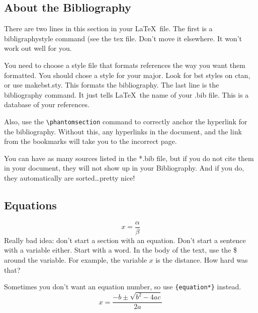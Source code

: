 \documentclass[12pt]{report}
\begin{document}
\subsection{About the Bibliography}
There are two lines in this section in your \LaTeX\ file. The first is a bibligraphystyle command (see the \textsf{tex} file. Don't move it elsewhere. It won't work out well for you.

You need to choose a style file that formats references the way you want them formatted.  You should chose a style for your major.  Look for bst styles on ctan, or use makebst.sty. This formats the bibliography.
The last line is the bibliography command. It just tells \LaTeX\  the name of your \textsf{.bib} file. This is a database of your references.

Also, use the \verb'\phantomsection' command to correctly anchor the hyperlink for the bibliography.  Without this, any hyperlinks in the document, and the link from the bookmarks will take you to the incorrect page.

You can have as many sources listed in the *.bib file, but if you do not cite them in your document, they will not show up in your Bibliography.  And if you do, they automatically are sorted\ldots pretty nice!

\subsection{Equations}\label{sec:equations}
\begin{equation}\label{eq:alphaoverbeta} %
x=\frac{\alpha}{\beta}
\end{equation}
Really bad idea: don't start a section with an equation. Don't start a sentence with a variable either. Start with a word. In the body of the text, use the \$ around the variable.  For example, the variable $x$ is the distance. How hard was that?

Sometimes you don't want an equation  number, so use \verb'{equation*}' instead.
\begin{equation*}
x=\frac{-b\pm\sqrt{b^2-4ac}}{2a}
\end{equation*}
\end{document}

